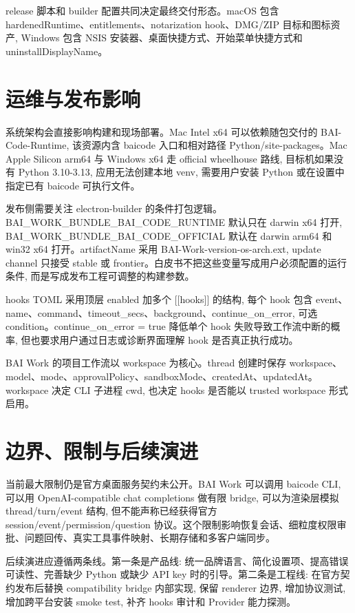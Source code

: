 release 脚本和 builder 配置共同决定最终交付形态。macOS 包含 hardenedRuntime、entitlements、notarization hook、DMG/ZIP 目标和图标资产, Windows 包含 NSIS 安装器、桌面快捷方式、开始菜单快捷方式和 uninstallDisplayName。

\section{运维与发布影响}
系统架构会直接影响构建和现场部署。Mac Intel x64 可以依赖随包交付的 BAI-Code-Runtime, 该资源内含 baicode 入口和相对路径 Python/site-packages。Mac Apple Silicon arm64 与 Windows x64 走 official wheelhouse 路线, 目标机如果没有 Python 3.10-3.13, 应用无法创建本地 venv, 需要用户安装 Python 或在设置中指定已有 baicode 可执行文件。

发布侧需要关注 electron-builder 的条件打包逻辑。BAI\_WORK\_BUNDLE\_BAI\_CODE\_RUNTIME 默认只在 darwin x64 打开, BAI\_WORK\_BUNDLE\_BAI\_CODE\_OFFICIAL 默认在 darwin arm64 和 win32 x64 打开。artifactName 采用 BAI-Work-{version}-{os}-{arch}.{ext}, update channel 只接受 stable 或 frontier。白皮书不把这些变量写成用户必须配置的运行条件, 而是写成发布工程可调整的构建参数。

hooks TOML 采用顶层 enabled 加多个 [[hooks]] 的结构, 每个 hook 包含 event、name、command、timeout\_secs、background、continue\_on\_error, 可选 condition。continue\_on\_error = true 降低单个 hook 失败导致工作流中断的概率, 但也要求用户通过日志或诊断界面理解 hook 是否真正执行成功。

BAI Work 的项目工作流以 workspace 为核心。thread 创建时保存 workspace、model、mode、approvalPolicy、sandboxMode、createdAt、updatedAt。workspace 决定 CLI 子进程 cwd, 也决定 hooks 是否能以 trusted workspace 形式启用。

\section{边界、限制与后续演进}
当前最大限制仍是官方桌面服务契约未公开。BAI Work 可以调用 baicode CLI, 可以用 OpenAI-compatible chat completions 做有限 bridge, 可以为渲染层模拟 thread/turn/event 结构, 但不能声称已经获得官方 session/event/permission/question 协议。这个限制影响恢复会话、细粒度权限审批、问题回传、真实工具事件映射、长期存储和多客户端同步。

后续演进应遵循两条线。第一条是产品线: 统一品牌语言、简化设置项、提高错误可读性、完善缺少 Python 或缺少 API key 时的引导。第二条是工程线: 在官方契约发布后替换 compatibility bridge 内部实现, 保留 renderer 边界, 增加协议测试, 增加跨平台安装 smoke test, 补齐 hooks 审计和 Provider 能力探测。

